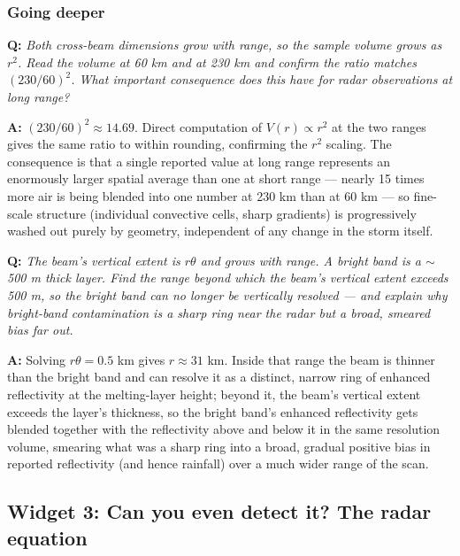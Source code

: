 \documentclass[11pt]{article}
\newenvironment{qa}[1]{\par\noindent\textbf{\color{qgray}Q: }\emph{#1}\par\noindent\textbf{A: }}{\par\vspace{6pt}}
\newcommand{\tier}[1]{\subsubsection*{#1}}
\begin{document}
\tier{Going deeper}
\begin{qa}{Both cross-beam dimensions grow with range, so the sample volume grows as $r^2$. Read the volume at 60 km and at 230 km and confirm the ratio matches $(230/60)^2$. What important consequence does this have for radar observations at long range?}
$(230/60)^2\approx14.69$. Direct computation of $V(r)\propto r^2$ at the two ranges gives the same ratio to within rounding, confirming the $r^2$ scaling. The consequence is that a single reported value at long range represents an enormously larger spatial average than one at short range --- nearly 15 times more air is being blended into one number at 230 km than at 60 km --- so fine-scale structure (individual convective cells, sharp gradients) is progressively washed out purely by geometry, independent of any change in the storm itself.
\end{qa}
\begin{qa}{The beam's vertical extent is $r\theta$ and grows with range. A bright band is a $\sim$500 m thick layer. Find the range beyond which the beam's vertical extent exceeds 500 m, so the bright band can no longer be vertically resolved --- and explain why bright-band contamination is a sharp ring near the radar but a broad, smeared bias far out.}
Solving $r\theta=0.5$ km gives $r\approx31$ km. Inside that range the beam is thinner than the bright band and can resolve it as a distinct, narrow ring of enhanced reflectivity at the melting-layer height; beyond it, the beam's vertical extent exceeds the layer's thickness, so the bright band's enhanced reflectivity gets blended together with the reflectivity above and below it in the same resolution volume, smearing what was a sharp ring into a broad, gradual positive bias in reported reflectivity (and hence rainfall) over a much wider range of the scan.
\end{qa}

\subsection{Widget 3: Can you even detect it? The radar equation}
\end{document}
